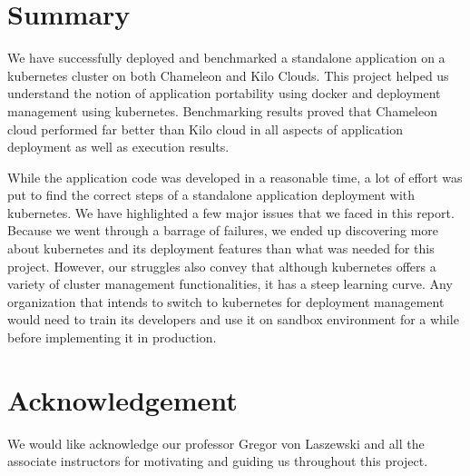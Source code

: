 \documentclass[9pt,twocolumn,twoside]{../../styles/osajnl}
\begin{document}
{\section{Summary}

We have successfully deployed and benchmarked a standalone application
on a kubernetes cluster on both Chameleon and Kilo Clouds. This
project helped us understand the notion of application portability
using docker and deployment management using kubernetes. Benchmarking
results proved that Chameleon cloud performed far better than Kilo
cloud in all aspects of application deployment as well as execution
results.

\noindent
While the application code was developed in a reasonable time, a lot
of effort was put to find the correct steps of a standalone
application deployment with kubernetes. We have highlighted a few
major issues that we faced in this report. Because we went through a
barrage of failures, we ended up discovering more about kubernetes and
its deployment features than what was needed for this
project. However, our struggles also convey that although kubernetes
offers a variety of cluster management functionalities, it has a steep
learning curve. Any organization that intends to switch to kubernetes
for deployment management would need to train its developers and use
it on sandbox environment for a while before implementing it in
production.

\section{Acknowledgement}

We would like acknowledge our professor Gregor von Laszewski and all
the associate instructors for motivating and guiding us throughout
this project.


 

}
\end{document}

